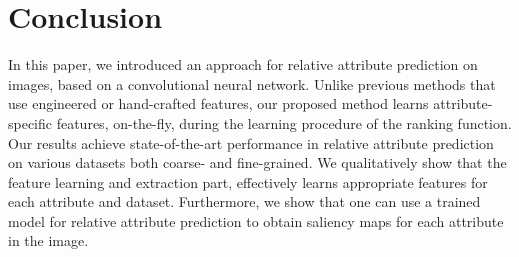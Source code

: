 

\section{Conclusion}
\label{sec.5}

In this paper, we introduced an approach for relative attribute prediction on images, based on a convolutional neural network. Unlike previous methods that use engineered or hand-crafted features, our proposed method learns attribute-specific features, on-the-fly, during the learning procedure of the ranking function. Our results achieve state-of-the-art performance in relative attribute prediction on various datasets both coarse- and fine-grained.
We qualitatively show that the feature learning and extraction part, effectively learns appropriate features for each attribute and dataset.
Furthermore, we show that one can use a trained model for relative attribute prediction to obtain saliency maps for each attribute in the image.
